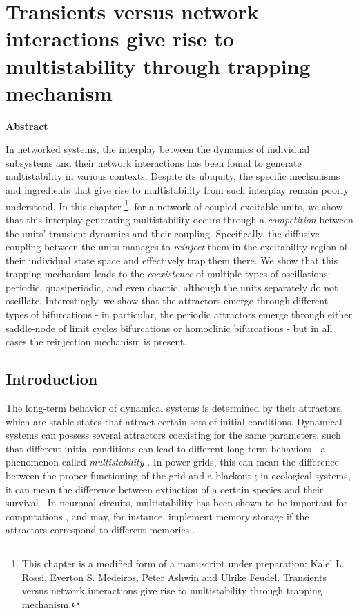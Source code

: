 \chapter{Transients versus network interactions give rise to multistability through trapping mechanism}\label{chap:multistability}

\vspace{1.5em}
\noindent
{\large\textbf{Abstract}} \vspace{0.2cm}

In networked systems, the interplay between the dynamics of individual subsystems and their network interactions has been found to generate multistability in various contexts. Despite its ubiquity, the specific mechanisms and ingredients that give rise to multistability from such interplay remain poorly understood. In this chapter \footnote[1]{This chapter is a modified form of a manuscript under preparation: Kalel L. Rossi, Everton S. Medeiros, Peter Ashwin and Ulrike Feudel. Transients versus network interactions give rise to multistability through trapping mechanism.}, for a network of coupled excitable units, we show that this interplay generating multistability occurs through a \textit{competition} between the units' transient dynamics and their coupling. Specifically, the diffusive coupling between the units manages to \textit{reinject} them in the excitability region of their individual state space and effectively trap them there. We show that this trapping mechanism leads to the \textit{coexistence} of multiple types of oscillations: periodic, quasiperiodic, and even chaotic, although the units separately do not oscillate. Interestingly, we show that the attractors emerge through different types of bifurcations - in particular, the periodic attractors emerge through either saddle-node of limit cycles bifurcations or homoclinic bifurcations - but in all cases the reinjection mechanism is present. 
\vspace{1.5em}

\section{Introduction}

The long-term behavior of dynamical systems is determined by their attractors, which are stable states that attract certain sets of initial conditions. Dynamical systems can possess several attractors coexisting for the same parameters, such that different initial conditions can lead to different long-term behaviors - a phenomenon called \textit{multistability} \cite{pisarchik2014control, feudel2018multistability}. In power grids, this can mean the difference between the proper functioning of the grid and a blackout \cite{motter2013spontaneous}; in ecological systems, it can mean the difference between extinction of a certain species and their survival \cite{meng2022the}. In neuronal circuits, multistability has been shown to be important for computations \cite{driscoll2024flexible}, and may, for instance, implement memory storage if the attractors correspond to different memories \cite{foss1996multistability, wilson1972excitatory}.

